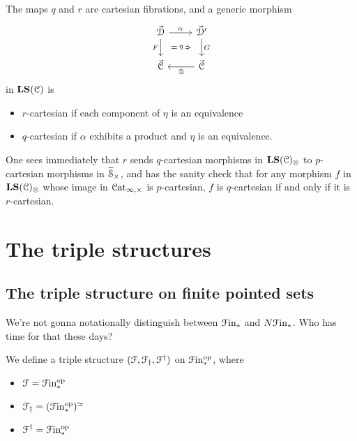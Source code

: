 \documentclass[main.tex]{subfiles}
\begin{document}
\begin{proposition}
  The maps $q$ and $r$ are cartesian fibrations, and a generic morphism
  \begin{equation*}
    \begin{tikzcd}
      \vec{\category{D}}
      \arrow[r, "\alpha"]
      \arrow[d, ""{name=L, right}, "F"{left}]
      & \vec{\category{D}}'
      \arrow[d, ""{name=R, left}, "G"{right}]
      \\
      \vec{\category{C}}
      & \vec{\category{C}}
      \arrow[l, "\otimes"]
      \arrow[Rightarrow, from=L, to=R, shorten=1.5ex, "\eta"{description}]
    \end{tikzcd}
  \end{equation*}
  in $\mathbf{LS}(\mathcal{C})$ is
  \begin{itemize}
    \item $r$-cartesian if each component of $\eta$ is an equivalence

    \item $q$-cartesian if $\alpha$ exhibits a product and $\eta$ is an equivalence.
  \end{itemize}
\end{proposition}
One sees immediately that $r$ sends $q$-cartesian morphisms in $\mathbf{LS}(\mathcal{C})_{\otimes}$ to $p$-cartesian morphisms in $\widetilde{\mathcal{S}}_{\times}$, and has the sanity check that for any morphism $f$ in $\mathbf{LS}(\mathcal{C})_{\otimes}$ whose image in $\mathcal{C}\mathrm{at}_{\infty,\times}$ is $p$-cartesian, $f$ is $q$-cartesian if and only if it is $r$-cartesian.

\section{The triple structures}
\label{sec:the_triple_structures}

\subsection{The triple structure on finite pointed sets}
\label{ssc:the_triple_structure_on_finite_pointed_sets}

We're not gonna notationally distinguish between $\mathcal{F}\mathrm{in}_{*}$ and $N\mathcal{F}\mathrm{in}_{*}$. Who has time for that these days?

We define a triple structure $(\mathcal{F}, \mathcal{F}_{\dagger}, \mathcal{F}^{\dagger})$ on $\mathcal{F}\mathrm{in}_{*}^{\mathrm{op}}$, where
\begin{itemize}
  \item $\mathcal{F} = \mathcal{F}\mathrm{in}_{*}^{\mathrm{op}}$

  \item $\mathcal{F}_{\dagger} = (\mathcal{F}\mathrm{in}_{*}^{\mathrm{op}})^{\simeq}$

  \item $\mathcal{F}^{\dagger} = \mathcal{F}\mathrm{in}_{*}^{\mathrm{op}}$
\end{itemize}
\end{document}
